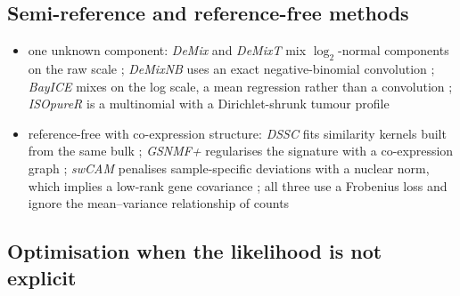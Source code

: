 \subsection{Semi-reference and reference-free methods}

\begin{itemize}
  \item one unknown component: \emph{DeMix} and \emph{DeMixT} mix \(\log_{2}\)-normal components on the raw scale
        \cite{ahnDeMixDeconvolutionMixed2013,wangTranscriptomeDeconvolutionHeterogeneous2018}; \emph{DeMixNB} uses an
        exact negative-binomial convolution \cite{montierthDeconvolutionSparsecountRNA2025}; \emph{BayICE} mixes on the
        log scale, a mean regression rather than a convolution \cite{taiBayiceBayesianHierarchicalModel2021};
        \emph{ISOpureR} is a multinomial with a Dirichlet-shrunk tumour profile
        \cite{anghelISOpureRImplementationComputational2015}
  \item reference-free with co-expression structure: \emph{DSSC} fits similarity kernels built from the same bulk
        \cite{wangDeconvolutionBulkGene2024}; \emph{GSNMF+} regularises the signature with a co-expression graph
        \cite{liAugmentedGSNMFModel2025}; \emph{swCAM} penalises sample-specific deviations with a nuclear norm, which
        implies a low-rank gene covariance \cite{chenSwCAMEstimationSubtypespecific2022}; all three use a Frobenius
        loss and ignore the mean--variance relationship of counts
\end{itemize}

\subsection{Optimisation when the likelihood is not explicit}
\label{app:review-optim}

